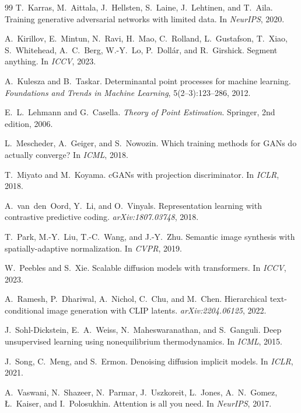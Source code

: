 \documentclass[12pt]{article}
\begin{document}
\begin{thebibliography}{99}
T.~Karras, M.~Aittala, J.~Hellsten, S.~Laine, J.~Lehtinen, and T.~Aila.
\newblock Training generative adversarial networks with limited data.
\newblock In \emph{NeurIPS}, 2020.

A.~Kirillov, E.~Mintun, N.~Ravi, H.~Mao, C.~Rolland, L.~Gustafson,
T.~Xiao, S.~Whitehead, A.~C.~Berg, W.-Y.~Lo, P.~Doll{\'a}r, and
R.~Girshick.
\newblock Segment anything.
\newblock In \emph{ICCV}, 2023.

A.~Kulesza and B.~Taskar.
\newblock Determinantal point processes for machine learning.
\newblock \emph{Foundations and Trends in Machine Learning}, 5(2--3):123--286,
2012.

E.~L.~Lehmann and G.~Casella.
\newblock \emph{Theory of Point Estimation}.
\newblock Springer, 2nd edition, 2006.

L.~Mescheder, A.~Geiger, and S.~Nowozin.
\newblock Which training methods for {GANs} do actually converge?
\newblock In \emph{ICML}, 2018.

T.~Miyato and M.~Koyama.
\newblock c{GAN}s with projection discriminator.
\newblock In \emph{ICLR}, 2018.

A.~van~den~Oord, Y.~Li, and O.~Vinyals.
\newblock Representation learning with contrastive predictive coding.
\newblock \emph{arXiv:1807.03748}, 2018.

T.~Park, M.-Y.~Liu, T.-C.~Wang, and J.-Y.~Zhu.
\newblock Semantic image synthesis with spatially-adaptive normalization.
\newblock In \emph{CVPR}, 2019.

W.~Peebles and S.~Xie.
\newblock Scalable diffusion models with transformers.
\newblock In \emph{ICCV}, 2023.

A.~Ramesh, P.~Dhariwal, A.~Nichol, C.~Chu, and M.~Chen.
\newblock Hierarchical text-conditional image generation with {CLIP} latents.
\newblock \emph{arXiv:2204.06125}, 2022.

J.~Sohl-Dickstein, E.~A.~Weiss, N.~Maheswaranathan, and S.~Ganguli.
\newblock Deep unsupervised learning using nonequilibrium thermodynamics.
\newblock In \emph{ICML}, 2015.

J.~Song, C.~Meng, and S.~Ermon.
\newblock Denoising diffusion implicit models.
\newblock In \emph{ICLR}, 2021.

A.~Vaswani, N.~Shazeer, N.~Parmar, J.~Uszkoreit, L.~Jones, A.~N.~Gomez,
\L.~Kaiser, and I.~Polosukhin.
\newblock Attention is all you need.
\newblock In \emph{NeurIPS}, 2017.

\end{thebibliography}
\end{document}
